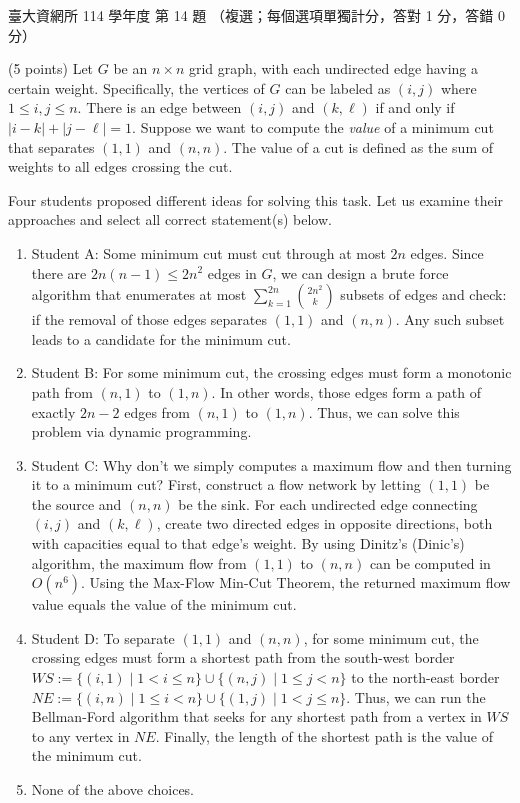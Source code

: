 \begin{pastexam}[label={px:ntu-114-dsa-14}]{臺大資網所 114 學年度 第 14 題}
（複選；每個選項單獨計分，答對 1 分，答錯 0 分）

(5 points) Let $G$ be an $n\times n$ grid graph, with each undirected edge having a certain weight.
Specifically, the vertices of $G$ can be labeled as $(i,j)$ where $1\le i,j\le n$. There is an edge between
$(i,j)$ and $(k,\ell)$ if and only if $|i-k|+|j-\ell|=1$. Suppose we want to compute the \textit{value} of a
minimum cut that separates $(1,1)$ and $(n,n)$. The value of a cut is defined as the sum of weights to all edges
crossing the cut.

Four students proposed different ideas for solving this task. Let us examine their approaches and select all
correct statement(s) below.
\begin{enumerate}[label=(\Alph*)]
\item Student A: Some minimum cut must cut through at most $2n$ edges. Since there are $2n(n-1)\le 2n^2$ edges in
$G$, we can design a brute force algorithm that enumerates at most $\sum_{k=1}^{2n}\binom{2n^2}{k}$ subsets of
edges and check: if the removal of those edges separates $(1,1)$ and $(n,n)$. Any such subset leads to a
candidate for the minimum cut.
\item Student B: For some minimum cut, the crossing edges must form a monotonic path from $(n,1)$ to $(1,n)$. In
other words, those edges form a path of exactly $2n-2$ edges from $(n,1)$ to $(1,n)$. Thus, we can solve this
problem via dynamic programming.
\item Student C: Why don't we simply computes a maximum flow and then turning it to a minimum cut? First,
construct a flow network by letting $(1,1)$ be the source and $(n,n)$ be the sink. For each undirected edge
connecting $(i,j)$ and $(k,\ell)$, create two directed edges in opposite directions, both with capacities equal
to that edge's weight. By using Dinitz's (Dinic's) algorithm, the maximum flow from $(1,1)$ to $(n,n)$ can be
computed in $O(n^6)$. Using the Max-Flow Min-Cut Theorem, the returned maximum flow value equals the value of
the minimum cut.
\item Student D: To separate $(1,1)$ and $(n,n)$, for some minimum cut, the crossing edges must form a shortest
path from the south-west border $WS:=\{(i,1)\mid 1<i\le n\}\cup\{(n,j)\mid 1\le j<n\}$ to the north-east border
$NE:=\{(i,n)\mid 1\le i<n\}\cup\{(1,j)\mid 1<j\le n\}$. Thus, we can run the Bellman-Ford algorithm that seeks for
any shortest path from a vertex in $WS$ to any vertex in $NE$. Finally, the length of the shortest path is the
value of the minimum cut.
\item None of the above choices.
\end{enumerate}
\end{pastexam}

